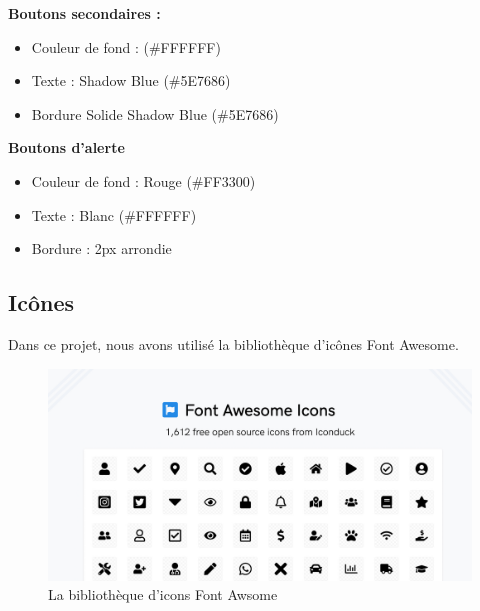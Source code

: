 \textbf{Boutons secondaires :}
\begin{itemize}
    \item Couleur de fond : (\#FFFFFF)

    \item Texte : Shadow Blue (\#5E7686)

    \item Bordure Solide Shadow Blue (\#5E7686)
\end{itemize}

\textbf{Boutons d'alerte}
\begin{itemize}
    \item Couleur de fond : Rouge (\#FF3300)

    \item Texte : Blanc (\#FFFFFF)

    \item Bordure : 2px arrondie
\end{itemize}










\subsection{Icônes}
\hspace{\parindent}Dans ce projet, nous avons utilisé la bibliothèque d'icônes Font Awesome.
\\
\begin{figure}[H] 
    \centering
    \includegraphics[width=15cm]{Figures/icons.PNG}
    \caption{La bibliothèque d'icons Font Awsome}
\end{figure}











